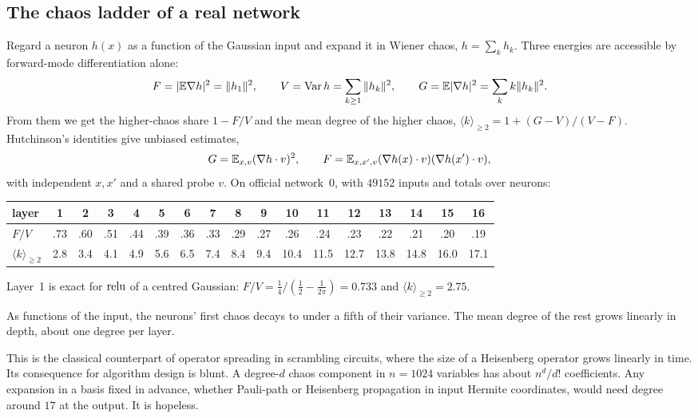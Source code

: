 \label{sec:growth}
\subsection{The chaos ladder of a real network}
Regard a neuron $h(x)$ as a function of the Gaussian input and expand it in Wiener chaos, $h=\sum_kh_k$. Three energies are accessible by
forward-mode differentiation alone:
\[
F=|\mathbb E\nabla h|^2=\|h_1\|^2,\qquad V=\operatorname{Var} h=\sum_{k\ge1}\|h_k\|^2,\qquad G=\mathbb E|\nabla h|^2=\sum_kk\|h_k\|^2 .
\]
From them we get the higher-chaos share $1-F/V$ and the mean degree of the higher chaos, $\langle k\rangle_{\ge2}=1+(G-V)/(V-F)$. Hutchinson's
identities give unbiased estimates,
\[G=\mathbb E_{x,v}(\nabla h\cdot v)^2,\qquad F=\mathbb E_{x,x',v}(\nabla h(x)\cdot v)(\nabla h(x')\cdot v),\]
with independent $x,x'$ and a shared probe $v$. On official network~0, with $49152$ inputs and totals over neurons:
\begin{center}\footnotesize\setlength{\tabcolsep}{3pt}
\begin{tabular}{lcccccccccccccccc}\toprule
layer&1&2&3&4&5&6&7&8&9&10&11&12&13&14&15&16\\\midrule
$F/V$&.73&.60&.51&.44&.39&.36&.33&.29&.27&.26&.24&.23&.22&.21&.20&.19\\
$\langle k\rangle_{\ge2}$&2.8&3.4&4.1&4.9&5.6&6.5&7.4&8.4&9.4&10.4&11.5&12.7&13.8&14.8&16.0&17.1\\\bottomrule
\end{tabular}
\end{center}
Layer~1 is exact for $\operatorname{relu}$ of a centred Gaussian: $F/V=\frac14/(\frac12-\frac1{2\pi})=0.733$ and $\langle k\rangle_{\ge2}=2.75$.

\begin{proposition}
As functions of the input, the neurons' first chaos decays to under a fifth of their variance. The mean degree of the rest grows linearly in
depth, about one degree per layer.
\end{proposition}
This is the classical counterpart of operator spreading in scrambling circuits, where the size of a Heisenberg operator grows linearly in
time. Its consequence for algorithm design is blunt. A degree-$d$ chaos component in $n=1024$ variables has about $n^d/d!$ coefficients. Any
expansion in a basis fixed in advance, whether Pauli-path or Heisenberg propagation in input Hermite coordinates, would need degree around
$17$ at the output. It is hopeless.

